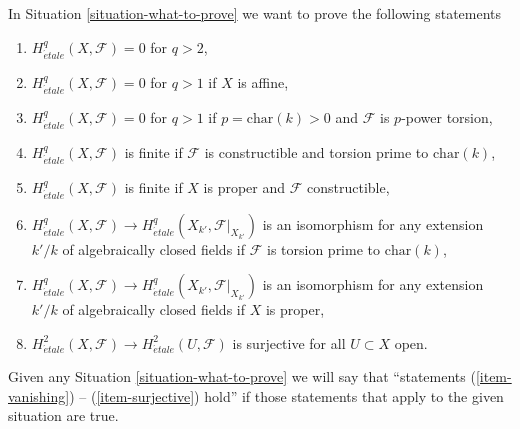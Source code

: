 \documentclass{amsart}
\theoremstyle{plain}
\theoremstyle{definition}
\theoremstyle{remark}
\numberwithin{equation}{subsection}
\def\etale{{\acute{e}tale}}
\begin{document}
\noindent
In Situation \ref{situation-what-to-prove}
we want to prove the following statements
\begin{enumerate}
\item
\label{item-vanishing}
$H^q_\etale(X, \mathcal{F}) = 0$ for $q > 2$,
\item
\label{item-vanishing-affine}
$H^q_\etale(X, \mathcal{F}) = 0$ for $q > 1$ if $X$ is affine,
\item
\label{item-vanishing-p-p}
$H^q_\etale(X, \mathcal{F}) = 0$ for $q > 1$ if $p = \text{char}(k) > 0$
and $\mathcal{F}$ is $p$-power torsion,
\item
\label{item-finite-prime-to-p}
$H^q_\etale(X, \mathcal{F})$ is finite if $\mathcal{F}$ is
constructible and torsion prime to $\text{char}(k)$,
\item
\label{item-finite-proper}
$H^q_\etale(X, \mathcal{F})$ is finite if $X$ is proper and
$\mathcal{F}$ constructible,
\item
\label{item-base-change-prime-to-p}
$H^q_\etale(X, \mathcal{F}) \to
H^q_\etale(X_{k'}, \mathcal{F}|_{X_{k'}})$ is an isomorphism
for any extension $k'/k$ of algebraically closed fields
if $\mathcal{F}$ is torsion prime to $\text{char}(k)$,
\item
\label{item-base-change-proper}
$H^q_\etale(X, \mathcal{F}) \to
H^q_\etale(X_{k'}, \mathcal{F}|_{X_{k'}})$ is an isomorphism
for any extension $k'/k$ of algebraically closed fields
if $X$ is proper,
\item
\label{item-surjective}
$H^2_\etale(X, \mathcal{F}) \to H^2_\etale(U, \mathcal{F})$
is surjective for all $U \subset X$ open.
\end{enumerate}
Given any Situation \ref{situation-what-to-prove}
we will say that
``statements (\ref{item-vanishing}) -- (\ref{item-surjective}) hold''
if those statements that apply to the given situation are true.
\end{document}
